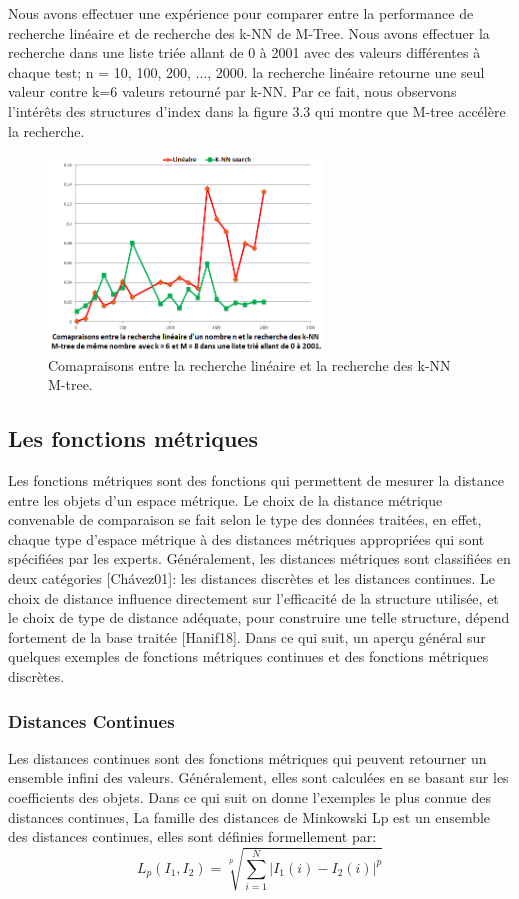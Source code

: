 Nous avons effectuer une expérience pour comparer entre la performance de recherche linéaire et de recherche des k-NN de M-Tree. Nous avons effectuer la recherche dans une liste triée allant de 0 à 2001 avec des valeurs différentes à chaque test; n = 10, 100, 200, ..., 2000. la recherche linéaire retourne une seul valeur contre k=6 valeurs retourné par k-NN. Par ce fait, nous observons l'intérêts des structures d'index dans la figure 3.3 qui montre que M-tree accélère la recherche.
\begin{figure}[H]
	\centering
	\includegraphics[width=0.65\textwidth]{Figures/mtreeVSlinear.png} %
	\caption{Comapraisons entre la recherche linéaire et la recherche des k-NN M-tree.
	}
\end{figure}


\subsection{Les fonctions métriques}
Les fonctions métriques sont des fonctions qui permettent de mesurer la distance entre les objets d’un espace métrique. Le choix de la distance métrique convenable de comparaison se fait selon le type des données traitées, en effet, chaque type d’espace métrique à des distances métriques appropriées qui sont spécifiées par les experts. Généralement, les distances métriques sont classifiées en deux catégories [Chávez01]: les distances discrètes et les distances continues. Le choix de distance influence directement sur l’efficacité de la structure utilisée, et le choix de type de distance adéquate, pour construire une telle structure, dépend fortement de la base traitée [Hanif18]. Dans ce qui suit, un aperçu général sur quelques exemples de fonctions métriques continues et des fonctions métriques discrètes.

\subsubsection{Distances Continues}
Les distances continues sont des fonctions métriques qui peuvent retourner un ensemble infini des valeurs. Généralement, elles sont calculées en se basant sur les coefficients des objets. Dans ce qui suit  on donne l'exemples le plus connue des distances continues, La famille des distances de Minkowski Lp est un ensemble des distances continues, elles sont définies formellement par:
\begin{equation}
L_p(I_1, I_2) = \sqrt[p]{\sum_{i=1}^{N}  \left|{I}_{1}(i)-{I}_{2}(i)\right|^p} 
\end{equation}

